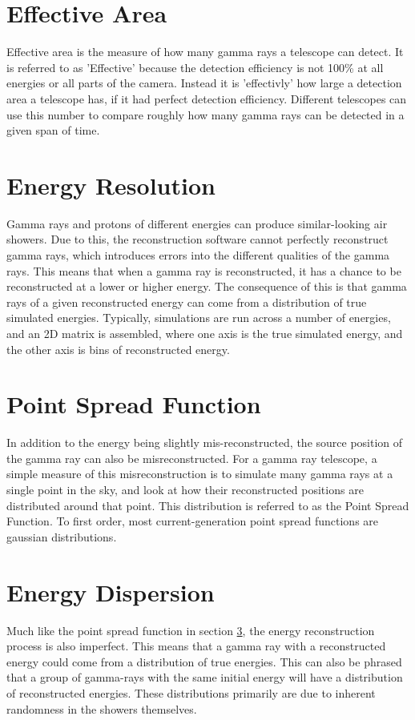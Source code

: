 \section{Effective Area}
Effective area is the measure of how many gamma rays a telescope can detect.
It is referred to as 'Effective' because the detection efficiency is not 100\% at all energies or all parts of the camera.
Instead it is 'effectivly' how large a detection area a telescope has, if it had perfect detection efficiency.
Different telescopes can use this number to compare roughly how many gamma rays can be detected in a given span of time.

\section{Energy Resolution}
Gamma rays and protons of different energies can produce similar-looking air showers.
Due to this, the reconstruction software cannot perfectly reconstruct gamma rays, which introduces errors into the different qualities of the gamma rays.
This means that when a gamma ray is reconstructed, it has a chance to be reconstructed at a lower or higher energy.
The consequence of this is that gamma rays of a given reconstructed energy can come from a distribution of true simulated energies.
Typically, simulations are run across a number of energies, and an 2D matrix is assembled, where one axis is the true simulated energy, and the other axis is bins of reconstructed energy.

\section{Point Spread Function}\label{sec:psf}
In addition to the energy being slightly mis-reconstructed, the source position of the gamma ray can also be misreconstructed.
For a gamma ray telescope, a simple measure of this misreconstruction is to simulate many gamma rays at a single point in the sky, and look at how their reconstructed positions are distributed around that point.
This distribution is referred to as the Point Spread Function.
To first order, most current-generation point spread functions are gaussian distributions.

\section{Energy Dispersion}
Much like the point spread function in section \ref{sec:psf}, the energy reconstruction process is also imperfect.
This means that a gamma ray with a reconstructed energy could come from a distribution of true energies.
This can also be phrased that a group of gamma-rays with the same initial energy will have a distribution of reconstructed energies.
These distributions primarily are due to inherent randomness in the showers themselves.

